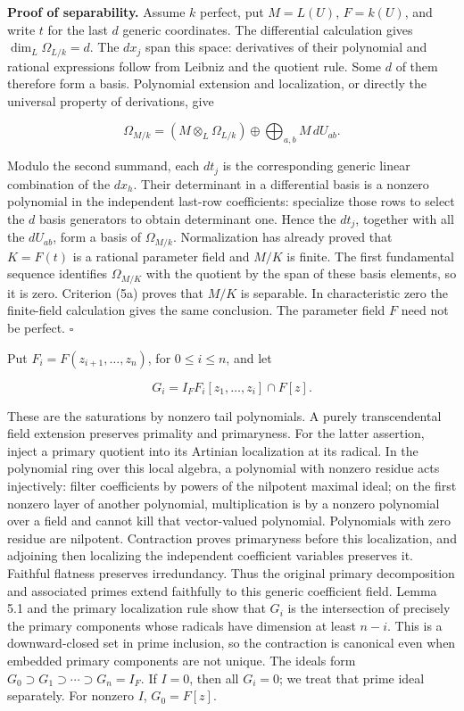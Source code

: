 \documentclass[
]{article}
\begin{document}
\textbf{Proof of separability.} Assume \(k\) perfect, put \(M=L(U)\),
\(F=k(U)\), and write \(t\) for the last \(d\) generic coordinates. The
differential calculation gives \(\dim_L\Omega_{L/k}=d\). The \(dx_j\)
span this space: derivatives of their polynomial and rational
expressions follow from Leibniz and the quotient rule. Some \(d\) of
them therefore form a basis. Polynomial extension and localization, or
directly the universal property of derivations, give

\[
\Omega_{M/k}=(M\otimes_L\Omega_{L/k})
\oplus\bigoplus_{a,b}M\,dU_{ab}.
\]

Modulo the second summand, each \(dt_j\) is the corresponding generic
linear combination of the \(dx_h\). Their determinant in a differential
basis is a nonzero polynomial in the independent last-row coefficients:
specialize those rows to select the \(d\) basis generators to obtain
determinant one. Hence the \(dt_j\), together with all the \(dU_{ab}\),
form a basis of \(\Omega_{M/k}\). Normalization has already proved that
\(K=F(t)\) is a rational parameter field and \(M/K\) is finite. The
first fundamental sequence identifies \(\Omega_{M/K}\) with the quotient
by the span of these basis elements, so it is zero. Criterion (5a)
proves that \(M/K\) is separable. In characteristic zero the
finite-field calculation gives the same conclusion. The parameter field
\(F\) need not be perfect. \(\square\)

Put \(F_i=F(z_{i+1},\ldots,z_n)\), for \(0\le i\le n\), and let

\[
G_i=I_F F_i[z_1,\ldots,z_i]\cap F[z].
\]

These are the saturations by nonzero tail polynomials. A purely
transcendental field extension preserves primality and primaryness. For
the latter assertion, inject a primary quotient into its Artinian
localization at its radical. In the polynomial ring over this local
algebra, a polynomial with nonzero residue acts injectively: filter
coefficients by powers of the nilpotent maximal ideal; on the first
nonzero layer of another polynomial, multiplication is by a nonzero
polynomial over a field and cannot kill that vector-valued polynomial.
Polynomials with zero residue are nilpotent. Contraction proves
primaryness before this localization, and adjoining then localizing the
independent coefficient variables preserves it. Faithful flatness
preserves irredundancy. Thus the original primary decomposition and
associated primes extend faithfully to this generic coefficient field.
Lemma 5.1 and the primary localization rule show that \(G_i\) is the
intersection of precisely the primary components whose radicals have
dimension at least \(n-i\). This is a downward-closed set in prime
inclusion, so the contraction is canonical even when embedded primary
components are not unique. The ideals form
\(G_0\supset G_1\supset\cdots\supset G_n=I_F\). If \(I=0\), then all
\(G_i=0\); we treat that prime ideal separately. For nonzero \(I\),
\(G_0=F[z]\).
\end{document}
